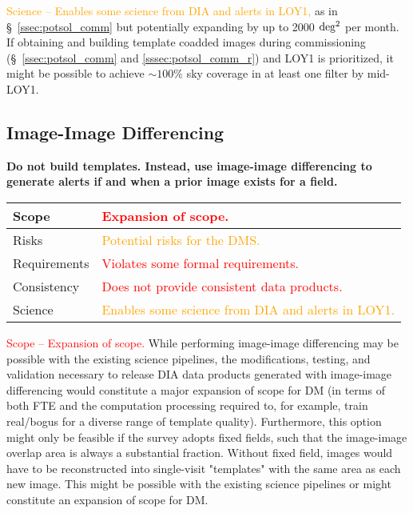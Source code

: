 \documentclass[DM,toc]{lsstdoc}
\begin{document}
\textcolor{orange}{ Science -- Enables some science from DIA and alerts in LOY1,} as in \S~\ref{ssec:potsol_comm} but potentially expanding by up to 2000 $\rm deg^2$ per month.
If obtaining and building template coadded images during commissioning (\S~\ref{ssec:potsol_comm} and \ref{sssec:potsol_comm_r}) and LOY1 is prioritized, it might be possible to achieve $\sim100\%$ sky coverage in at least one filter by mid-LOY1.



\clearpage
\subsection{Image-Image Differencing}\label{ssec:potsol_imgimg}

{\bf Do not build templates. Instead, use image-image differencing to generate alerts if and when a prior image exists for a field.}

\begin{center}
\begin{tabular}{|p{2.5cm}|p{13cm}|}
\hline
Scope & \textcolor{red}{Expansion of scope.} \\
\hline
Risks & \textcolor{orange}{Potential risks for the DMS.} \\
\hline
Requirements & \textcolor{red}{Violates some formal requirements.} \\
\hline
Consistency & \textcolor{red}{Does not provide consistent data products.} \\
\hline
Science & \textcolor{orange}{Enables some science from DIA and alerts in LOY1.} \\
\hline
\end{tabular}
\end{center}

\textcolor{red}{ Scope -- Expansion of scope.}
While performing image-image differencing may be possible with the existing science pipelines, the modifications, testing, and validation necessary to release DIA data products generated with image-image differencing would constitute a major expansion of scope for DM (in terms of both FTE and the computation processing required to, for example, train real/bogus for a diverse range of template quality).
Furthermore, this option might only be feasible if the survey adopts fixed fields, such that the image-image overlap area is always a substantial fraction.
Without fixed field, images would have to be reconstructed into single-visit "templates" with the same area as each new image.
This might be possible with the existing science pipelines or might constitute an expansion of scope for DM.
\end{document}

